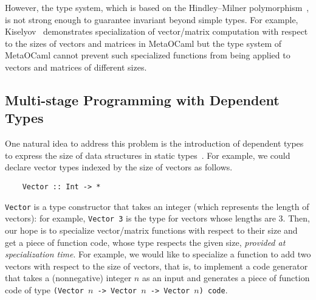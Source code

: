 
However, the type system, which is based on the Hindley--Milner
polymorphism~\cite{Milner78JCSS}, is not strong enough to guarantee
invariant beyond simple types.  For example, Kiselyov~\cite{8384206}
demonstrates specialization of vector/matrix computation with respect
to the sizes of vectors and matrices in MetaOCaml but the type system
of MetaOCaml cannot prevent such specialized functions from being applied to
vectors and matrices of different sizes.

\subsection{Multi-stage Programming with Dependent Types}


One natural idea to address this problem is the introduction of dependent types
to express the size of data structures in static types~\cite{Xi98}.  For
example, we could declare vector types indexed by the size of vectors as
follows.
\begin{verbatim}
    Vector :: Int -> *
\end{verbatim}
\verb|Vector| is a type constructor that takes an integer (which
represents the length of vectors): for example, \verb|Vector 3| is the
type for vectors whose lengths are 3.  Then, our hope is to specialize
vector/matrix functions with respect to their size and get a piece of
function code, whose type respects the given size, \emph{provided at
  specialization time}.  For example, we would like to specialize a
function to add two vectors with respect to the size of vectors, that
is, to implement a code generator that takes a (nonnegative) integer $n$ as an
input and generates a piece of function code of type
\verb|(Vector |$n$\verb| -> Vector |$n$\verb| -> Vector |$n$\verb|) code|.

